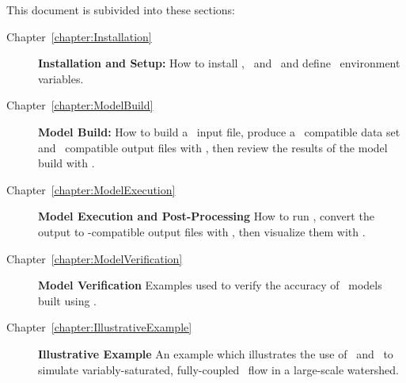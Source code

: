 This document is subivided into these sections:
\begin{description}
    \item[Chapter~\ref{chapter:Installation}]\textbf{Installation and Setup:} How to install \mut, \mfus\ and \tecplot\ and define \windows\ environment variables.
     \item[Chapter~\ref{chapter:ModelBuild}]\textbf{Model Build:} How to build a \mut\ input file, produce a \mfus\ compatible data set and \tecplot\ compatible output files with \mut, then review the results of the model build with \tecplot.
    \item[Chapter~\ref{chapter:ModelExecution}]\textbf{Model Execution and Post-Processing} How to run \mfus, convert the output to \tecplot-compatible output files with \mut, then visualize them with \tecplot.
    \item[Chapter~\ref{chapter:ModelVerification}]\textbf{Model Verification} Examples used to verify the accuracy of \mfus\ models built using \mut.
    \item[Chapter~\ref{chapter:IllustrativeExample}]\textbf{Illustrative Example} An example which illustrates the use of \mut\ and \mfus\ to simulate variably-saturated, fully-coupled   \gwf\-\swf\ flow in a large-scale watershed.
\end{description} 